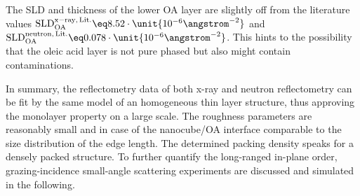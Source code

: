 \documentclass[\main/dresen_thesis.tex]{subfiles}
\begin{document}
  The SLD and thickness of the lower OA layer are slightly off from the literature values $\mathrm{SLD}_{\mathrm{OA}}^{\mathrm{x-ray, \,Lit.}} \eq 8.52 \cdot \unit{10^{-6} \angstrom^{-2}}$ and $\mathrm{SLD}_{\mathrm{OA}}^{\mathrm{neutron, \,Lit.}} \eq 0.078 \cdot \unit{10^{-6} \angstrom^{-2}}$.
  This hints to the possibility that the oleic acid layer is not pure phased but also might contain contaminations.

  In summary, the reflectometry data of both x-ray and neutron reflectometry can be fit by the same model of an homogeneous thin layer structure, thus approving the monolayer property on a large scale.
  The roughness parameters are reasonably small and in case of the nanocube/OA interface comparable to the size distribution of the edge length.
  The determined packing density speaks for a densely packed structure.
  To further quantify the long-ranged in-plane order, grazing-incidence small-angle scattering experiments are discussed and simulated in the following.
\end{document}
